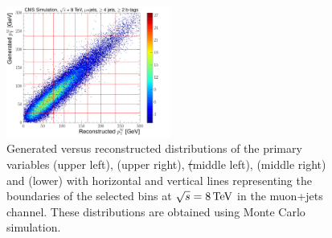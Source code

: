 \begin{figure}[hbtp]
	 \includegraphics[width=0.48\textwidth]{Chapters/04_Analysis/04b_XSections/images/binning/muon_WPT_8TeV.pdf}\hfill
	 \caption{Generated versus reconstructed distributions of the primary variables \met (upper left), \HT (upper
	 right), \st (middle left), \mt (middle right) and \wpt (lower) with horizontal and vertical lines
	 representing the boundaries of the selected bins at $\sqrt{s}=8\,\text{Te\hspace{-.08em}V}$ in the muon+jets channel. These
	 distributions are obtained using \ttbar Monte Carlo simulation.}
     \label{fig:binning_7TeV_muon}
 \end{figure}


